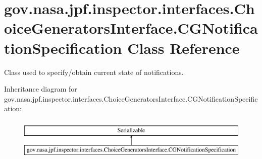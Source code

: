 \hypertarget{classgov_1_1nasa_1_1jpf_1_1inspector_1_1interfaces_1_1_choice_generators_interface_1_1_c_g_notification_specification}{}\section{gov.\+nasa.\+jpf.\+inspector.\+interfaces.\+Choice\+Generators\+Interface.\+C\+G\+Notification\+Specification Class Reference}
\label{classgov_1_1nasa_1_1jpf_1_1inspector_1_1interfaces_1_1_choice_generators_interface_1_1_c_g_notification_specification}


Class used to specify/obtain current state of notifications.  


Inheritance diagram for gov.\+nasa.\+jpf.\+inspector.\+interfaces.\+Choice\+Generators\+Interface.\+C\+G\+Notification\+Specification\+:\begin{figure}[H]
\begin{center}
\leavevmode
\includegraphics[height=2.000000cm]{classgov_1_1nasa_1_1jpf_1_1inspector_1_1interfaces_1_1_choice_generators_interface_1_1_c_g_notification_specification}
\end{center}
\end{figure}
